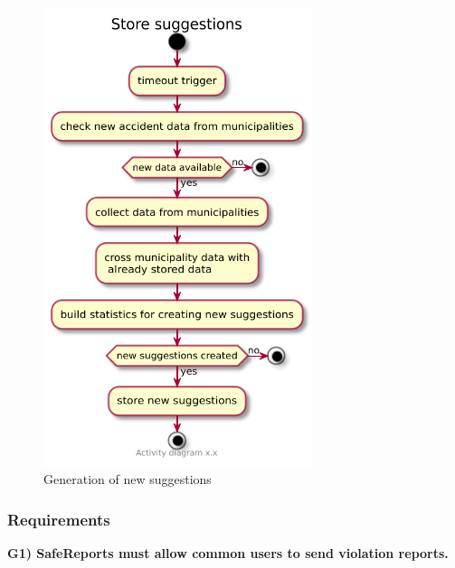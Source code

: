 \documentclass[a4paper]{article}
\begin{document}
\begin{figure}[H]
\centering
\includegraphics[width=0.7\textwidth]{activity_diagram_create_suggestions}
\caption{Generation of new suggestions}
\end{figure}

\subsubsection{Requirements}\label{header-n643}

\textbf{G1) SafeReports must allow common users to send violation
reports.}
\end{document}
